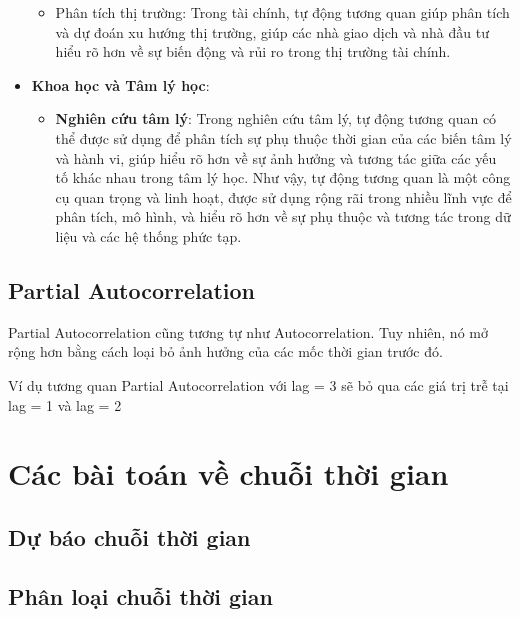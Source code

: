 \documentclass[
]{book}
\providecommand{\tightlist}{%
  \setlength{\itemsep}{0pt}\setlength{\parskip}{0pt}}
\begin{document}
\begin{itemize}
  \begin{itemize}
  \tightlist
  \item
    Phân tích thị trường: Trong tài chính, tự động tương quan giúp phân tích và dự đoán xu hướng thị trường, giúp các nhà giao dịch và nhà đầu tư hiểu rõ hơn về sự biến động và rủi ro trong thị trường tài chính.
  \end{itemize}
\item
  \textbf{Khoa học và Tâm lý học}:

  \begin{itemize}
  \tightlist
  \item
    \textbf{Nghiên cứu tâm lý}: Trong nghiên cứu tâm lý, tự động tương quan có thể được sử dụng để phân tích sự phụ thuộc thời gian của các biến tâm lý và hành vi, giúp hiểu rõ hơn về sự ảnh hưởng và tương tác giữa các yếu tố khác nhau trong tâm lý học.
    Như vậy, tự động tương quan là một công cụ quan trọng và linh hoạt, được sử dụng rộng rãi trong nhiều lĩnh vực để phân tích, mô hình, và hiểu rõ hơn về sự phụ thuộc và tương tác trong dữ liệu và các hệ thống phức tạp.
  \end{itemize}
\end{itemize}

\subsection{Partial Autocorrelation}\label{partial-autocorrelation}

Partial Autocorrelation cũng tương tự như Autocorrelation. Tuy nhiên, nó mở rộng hơn bằng cách loại bỏ ảnh hưởng của các mốc thời gian trước đó.

Ví dụ tương quan Partial Autocorrelation với lag = 3 sẽ bỏ qua các giá trị trễ tại lag = 1 và lag = 2

\section{Các bài toán về chuỗi thời gian}\label{cuxe1c-buxe0i-touxe1n-vux1ec1-chuux1ed7i-thux1eddi-gian}

\subsection{Dự báo chuỗi thời gian}\label{dux1b0-bao-chuuxf4i-thux1a1i-gian}

\subsection{Phân loại chuỗi thời gian}\label{phuxe2n-loux1ea1i-chuux1ed7i-thux1eddi-gian}
\end{document}
